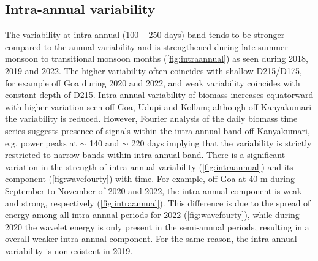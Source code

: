 \documentclass{article}
\begin{document}
	\subsection{Intra-annual variability}
	The variability at intra-annual (100 -- 250 days) band tends to be stronger compared to the annual variability and is strengthened during late summer monsoon to transitional monsoon months (\cref{fig:intraannual}) as seen during 2018, 2019 and 2022. The higher variability often coincides with shallow D215/D175, for example off Goa during 2020 and 2022, and weak variability coincides with constant depth of D215. Intra-annual variability of biomass increases equatorward with higher variation seen off Goa, Udupi and Kollam; although off Kanyakumari the variability is reduced. However, Fourier analysis of the daily biomass time series suggests presence of signals within the intra-annual band off Kanyakumari, e.g, power peaks at $\sim$ 140 and $\sim$ 220 days implying that the variability is strictly restricted to narrow bands within intra-annual band. There is a significant variation in the strength of intra-annual variability (\cref{fig:intraannual}) and its component (\cref{fig:wavefourty}) with time. For example, off Goa at 40 m during September to November of 2020 and 2022, the intra-annual component is weak and strong, respectively (\cref{fig:intraannual}). This difference is due to the spread of energy among all intra-annual periods for 2022 (\cref{fig:wavefourty}), while during 2020 the wavelet energy is only present in the semi-annual periods, resulting in a overall weaker intra-annual component. For the same reason, the intra-annual variability is non-existent in 2019.
	
\end{document}

